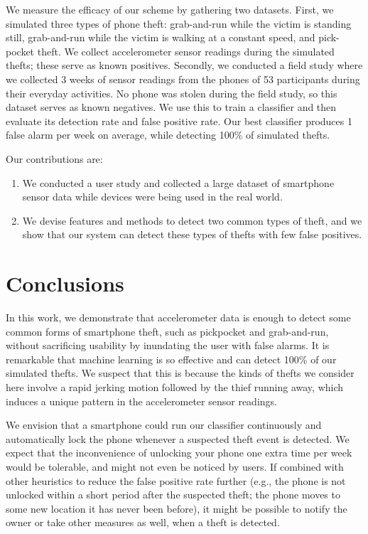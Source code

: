 We measure the efficacy of our scheme by gathering two datasets.
First, we simulated three types of phone theft: grab-and-run while the victim is standing still, grab-and-run while the victim is walking at a constant speed, and pick-pocket theft.
We collect accelerometer sensor readings during the simulated thefts; these serve as known positives.
Secondly, we conducted a field study where we collected 3 weeks of sensor readings from the phones of 53 participants during their everyday activities.
No phone was stolen during the field study, so this dataset serves as known negatives.
We use this to train a classifier and then evaluate its detection rate and false positive rate.
Our best classifier produces 1 false alarm per week on average, while detecting 100\% of simulated thefts.

Our contributions are:
\begin{enumerate}
  \item We conducted a user study and collected a large dataset of smartphone sensor data while devices were being used in the real world.
  \item We devise features and methods to detect two common types of theft, and we show that our system can detect these types of thefts with few false positives.
\end{enumerate}





\section{Conclusions}

In this work, we demonstrate that accelerometer data is enough to detect some common forms of smartphone theft, such as pickpocket and grab-and-run, without sacrificing usability by inundating the user with false alarms.
It is remarkable that machine learning is so effective and can detect 100\% of our simulated thefts.
We suspect that this is because the kinds of thefts we consider here involve a rapid jerking motion followed by the thief running away, which induces a unique pattern in the accelerometer sensor readings.

We envision that a smartphone could run our classifier continuously and automatically lock the phone whenever a suspected theft event is detected.
We expect that the inconvenience of unlocking your phone one extra time per week would be tolerable, and might not even be noticed by users.
If combined with other heuristics to reduce the false positive rate further (e.g., the phone is not unlocked within a short period after the suspected theft; the phone moves to some new location it has never been before), it might be possible to notify the owner or take other measures as well, when a theft is detected.

